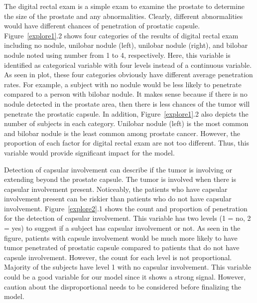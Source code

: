 \documentclass[11pt]{article}\usepackage[]{graphicx}\usepackage[]{color}
\begin{document}
\noindent The digital rectal exam is a simple exam to examine the prostate to determine the size of the prostate and any abnormalities. Clearly, different abnormalities would have different chances of penetration of prostatic capsule. Figure~\ref{explore1}.2 shows four categories of the results of digital rectal exam including no nodule, unilobar nodule (left), unilobar nodule (right), and bilobar nodule noted using number from 1 to 4, respectively. Here, this variable is identified as categorical variable with four levels instead of a continuous variable. As seen in plot, these four categories obviously have different average penetration rates. For example, a subject with no nodule would be less likely to penetrate compared to a person with bilobar nodule. It makes sense because if there is no nodule detected in the prostate area, then there is less chances of the tumor will penetrate the prostatic capsule. In addition, Figure~\ref{explore1}.2 also depicts the number of subjects in each category. Unilobar nodule (left) is the most common and bilobar nodule is the least common among prostate cancer. However, the proportion of each factor for digital rectal exam are not too different. Thus, this variable would provide significant impact for the model.   
\hfill \break

\noindent Detection of capsular involvement can describe if the tumor is involving or extending beyond the prostate capsule. The tumor is involved when there is capsular involvement present. Noticeably, the patients who have capsular involvement present can be riskier than patients who do not have capsular involvement. Figure~\ref{explore2}.1 shows the count and proportion of penetration for the detection of capsular involvement. This variable has two levels (1 = no, 2 = yes) to suggest if a subject has capsular involvement or not. As seen in the figure, patients with capsule involvement would be much more likely to have tumor penetrated of prostatic capsule compared to patients that do not have capsule involvement. However, the count for each level is not proportional. Majority of the subjects have level 1 with no capsular involvement. This variable could be a good variable for our model since it shows a strong signal. However, caution about the disproportional needs to be considered before finalizing the model.      
\end{document}
